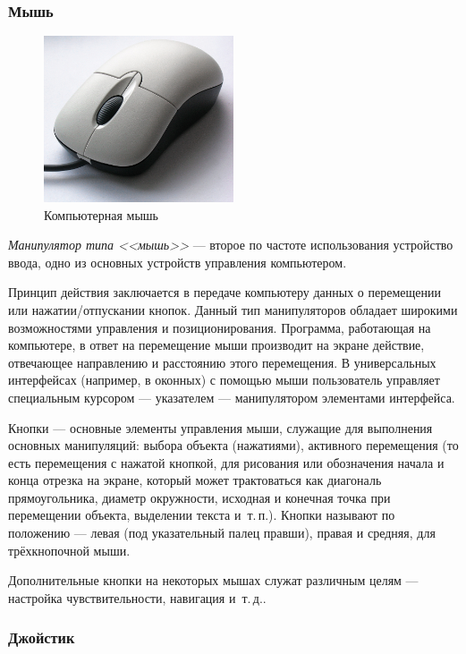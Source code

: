 \subsubsection{Мышь}\label{base:introduction:components:peripheral:mouse}
\begin{figure}
 \centering
 \includegraphics[width=0.5\textwidth]{base/Introduction/Mouse.jpg} 
 \caption{Компьютерная мышь}\label{base:introduction:components:peripheral:mousepic}
\end{figure}
\emph{Манипулятор типа <<мышь>>} --- второе по частоте использования устройство ввода, одно из основных устройств управления компьютером.

Принцип действия заключается в передаче компьютеру данных о перемещении или нажатии/отпускании кнопок.
Данный тип манипуляторов обладает широкими возможностями управления и позиционирования.
Программа, работающая на компьютере, в ответ на перемещение мыши производит на экране действие, отвечающее направлению и расстоянию этого перемещения.
В универсальных интерфейсах (например, в оконных) с помощью мыши пользователь управляет специальным курсором --- указателем --- манипулятором элементами интерфейса.

Кнопки --- основные элементы управления мыши, служащие для выполнения основных манипуляций: выбора объекта (нажатиями), активного перемещения (то есть перемещения с нажатой кнопкой, для рисования или обозначения начала и конца отрезка на экране, который может трактоваться как диагональ прямоугольника, диаметр окружности, исходная и конечная точка при перемещении объекта, выделении текста и~т.\,п.).
Кнопки называют по положению --- левая (под указательный палец правши), правая и средняя, для трёхкнопочной мыши.

Дополнительные кнопки на некоторых мышах служат различным целям --- настройка чувствительности, навигация и~т.\,д..

\subsubsection{Джойстик}\label{base:introduction:components:peripheral:joystick}

